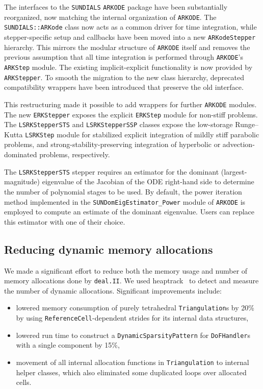 \documentclass{ansarticle-preprint}
\newcommand{\specialword}[1]{\texttt{#1}}
\newcommand{\dealii}{{\specialword{deal.II}}\xspace}
\begin{document}
The interfaces to the \texttt{SUNDIALS} \texttt{ARKODE} package have
been substantially reorganized, now matching the internal organization
of \texttt{ARKODE}. The \texttt{SUNDIALS::ARKode} class now acts as a common driver for time integration, while stepper-specific setup and callbacks have been moved into a new \texttt{ARKodeStepper} hierarchy. This mirrors the modular structure of \texttt{ARKODE} itself and removes the previous assumption that all time integration is performed through \texttt{ARKODE}'s \texttt{ARKStep} module. The existing implicit-explicit functionality is now provided by \texttt{ARKStepper}. To smooth the migration to the new class hierarchy, deprecated compatibility wrappers have been introduced that preserve the old interface.

This restructuring made it possible to add wrappers for further \texttt{ARKODE} modules. The new \texttt{ERKStepper} exposes the explicit \texttt{ERKStep} module for non-stiff problems. The \texttt{LSRKStepperSTS} and \texttt{LSRKStepperSSP} classes expose the low-storage Runge--Kutta \texttt{LSRKStep} module for stabilized explicit integration of mildly stiff parabolic problems, and strong-stability-preserving integration of hyperbolic or advection-dominated problems, respectively.

The \texttt{LSRKStepperSTS} stepper requires an estimator for the dominant (largest-magnitude) eigenvalue of the Jacobian of the ODE right-hand side to determine the number of polynomial stages to be used. By default, the power iteration method implemented in the \texttt{SUNDomEigEstimator\_Power} module of \texttt{ARKODE} is employed to compute an estimate of the dominant eigenvalue. Users can replace this estimator with one of their choice.

\subsection{Reducing dynamic memory allocations}
\label{subsec:memory}

We made a significant effort to reduce both the memory usage and number
of memory allocations done by \dealii. We used
heaptrack~\cite{wolff2026heaptrack} to detect and measure the number of
dynamic allocations. Significant improvements include:
\begin{itemize}
  \item lowered memory consumption of purely tetrahedral
    \texttt{Triangulation}s by 20\% by using
    \texttt{ReferenceCell}-dependent strides for its internal data
    structures,

  \item lowered run time to construct a \texttt{DynamicSparsityPattern}
    for \texttt{DoFHandler}s with a single component by 15\%,

  \item movement of all internal allocation functions in
    \texttt{Triangulation} to internal helper classes, which also
    eliminated some duplicated loops over allocated cells.
\end{itemize}
\end{document}
